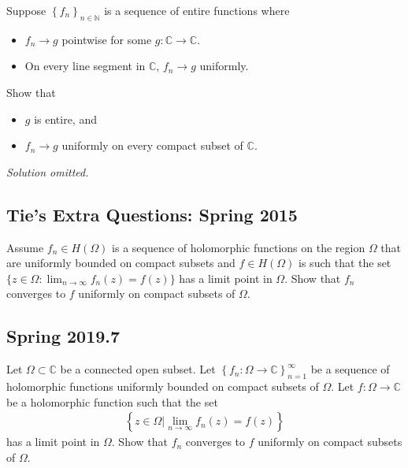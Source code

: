\begin{problem}[?]

Suppose \(\left\{{f_n}\right\}_{n\in {\mathbb{N}}}\) is a sequence of
entire functions where

\begin{itemize}
\tightlist
\item
  \(f_n \to g\) pointwise for some \(g:{\mathbb{C}}\to{\mathbb{C}}\).
\item
  On every line segment in \({\mathbb{C}}\), \(f_n \to g\) uniformly.
\end{itemize}

Show that

\begin{itemize}
\tightlist
\item
  \(g\) is entire, and
\item
  \(f_n\to g\) uniformly on every compact subset of \({\mathbb{C}}\).
\end{itemize}

\end{problem}

\emph{Solution omitted.}

\hypertarget{ties-extra-questions-spring-2015}{%
\subsection{Tie's Extra Questions: Spring
2015}\label{ties-extra-questions-spring-2015}}

\begin{problem}[?]

Assume \(f_n \in H(\Omega)\) is a sequence of holomorphic functions on
the region \(\Omega\) that are uniformly bounded on compact subsets and
\(f \in H(\Omega)\) is such that the set
\(\displaystyle \{z \in \Omega: \lim_{n \rightarrow \infty} f_n(z) = f(z) \}\)
has a limit point in \(\Omega\). Show that \(f_n\) converges to \(f\)
uniformly on compact subsets of \(\Omega\).

\end{problem}

\hypertarget{spring-2019.7}{%
\subsection{Spring 2019.7}\label{spring-2019.7}}

\begin{problem}[?]

Let \(\Omega \subset {\mathbb{C}}\) be a connected open subset. Let
\(\left\{f_{n}: \Omega \rightarrow {\mathbb{C}}\right\}_{n=1}^{\infty}\)
be a sequence of holomorphic functions uniformly bounded on compact
subsets of \(\Omega\). Let \(f: \Omega \rightarrow {\mathbb{C}}\) be a
holomorphic function such that the set
\begin{align*}
\left\{z \in \Omega \mathrel{\Big|}\lim _{n \rightarrow \infty} f_{n}(z)=f(z)\right\}
\end{align*}
has a limit point in \(\Omega\). Show that \(f_{n}\) converges to \(f\)
uniformly on compact subsets of \(\Omega\).

\end{problem}

